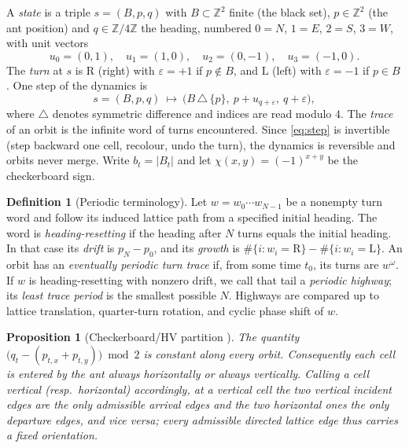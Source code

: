 \documentclass[11pt,reqno]{amsart}
\theoremstyle{plain}
\newtheorem{proposition}[theorem]{Proposition}
\theoremstyle{definition}
\newtheorem{definition}[theorem]{Definition}
\newcommand{\Z}{\mathbb{Z}}
\newcommand{\che}{\chi}
\newcommand{\turnR}{\mathrm{R}}
\newcommand{\turnL}{\mathrm{L}}
\begin{document}
A \emph{state} is a triple $s=(B,p,q)$ with $B\subset\Z^2$ finite (the black set),
$p\in\Z^2$ (the ant position) and $q\in\Z/4\Z$ the heading, numbered $0=N$, $1=E$,
$2=S$, $3=W$, with unit vectors
\[
u_0=(0,1),\quad u_1=(1,0),\quad u_2=(0,-1),\quad u_3=(-1,0).
\]
The \emph{turn} at $s$ is $\turnR$ (right) with $\varepsilon=+1$ if $p\notin B$, and
$\turnL$ (left) with $\varepsilon=-1$ if $p\in B$. One step of the dynamics is
\begin{equation}\label{eq:step}
s=(B,p,q)\ \longmapsto\ \bigl(B\,\triangle\,\{p\},\ p+u_{q+\varepsilon},\ q+\varepsilon\bigr),
\end{equation}
where $\triangle$ denotes symmetric difference and indices are read modulo $4$. The
\emph{trace} of an orbit is the infinite word of turns encountered. Since
\eqref{eq:step} is invertible (step backward one cell, recolour, undo the turn), the
dynamics is reversible and orbits never merge. Write $b_t=|B_t|$ and let
$\che(x,y)=(-1)^{x+y}$ be the checkerboard sign.

\begin{definition}[Periodic terminology]\label{def:periodic}
Let $w=w_0\cdots w_{N-1}$ be a nonempty turn word and follow its induced lattice
path from a specified initial heading. The word is \emph{heading-resetting} if the
heading after $N$ turns equals the initial heading. In that case its \emph{drift} is
$p_N-p_0$, and its \emph{growth} is
$\#\{i:w_i=\turnR\}-\#\{i:w_i=\turnL\}$. An orbit has an \emph{eventually periodic
turn trace} if, from some time $t_0$, its turns are $w^\omega$. If $w$ is
heading-resetting with nonzero drift, we call that tail a \emph{periodic highway};
its \emph{least trace period} is the smallest possible $N$. Highways are compared up
to lattice translation, quarter-turn rotation, and cyclic phase shift of $w$.
\end{definition}

\begin{proposition}[Checkerboard/HV partition {\cite{GaleProppSutnerTroubetzkoy1995}}]
\label{prop:hv}
The quantity $\bigl(q_t-(p_{t,x}+p_{t,y})\bigr)\bmod 2$ is constant along every
orbit. Consequently each cell is entered by the ant always horizontally or always
vertically. Calling a cell \emph{vertical} (resp.\ \emph{horizontal}) accordingly,
at a vertical cell the two vertical incident edges are the only admissible arrival
edges and the two horizontal ones the only departure edges, and vice versa; every
admissible directed lattice edge thus carries a fixed orientation.
\end{proposition}
\end{document}
